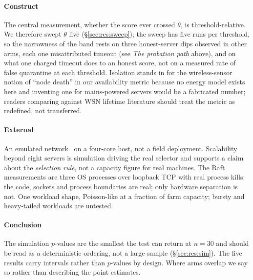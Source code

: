 \documentclass[10pt,twocolumn,letterpaper]{article}
\begin{document}
\paragraph*{Construct}
The central measurement, whether the score ever crossed $\theta$, is
threshold-relative. We therefore swept $\theta$ live (\S\ref{sec:res:sweep});
the sweep has five runs per threshold, so the narrowness of the band rests on
three honest-server dips observed in other arms, each one misattributed timeout
(see \emph{The probation path} above), and on what one charged timeout does to
an honest score, not on a measured rate of false quarantine at each threshold. Isolation
stands in for the wireless-sensor notion of ``node death'' in our availability
metric because no energy model exists here and inventing one for mains-powered
servers would be a fabricated number; readers comparing against WSN lifetime
literature should treat the metric as redefined, not transferred.

\paragraph*{External}
An emulated network~\cite{lantz2010mininet} on a four-core host, not a field
deployment. Scalability beyond eight servers is simulation driving the real
selector and supports a claim about the \emph{selection rule}, not a capacity
figure for real machines. The Raft measurements are three OS processes over
loopback TCP with real process kills: the code, sockets and process boundaries
are real; only hardware separation is not. One workload shape, Poisson-like at
a fraction of farm capacity; bursty and heavy-tailed workloads are untested.

\paragraph*{Conclusion}
The simulation $p$-values are the smallest the test can return at $n = 30$ and
should be read as a deterministic ordering, not a large sample
(\S\ref{sec:res:sim}). The live results carry intervals rather than $p$-values
by design. Where arms overlap we say so rather than describing the point
estimates.
\end{document}
